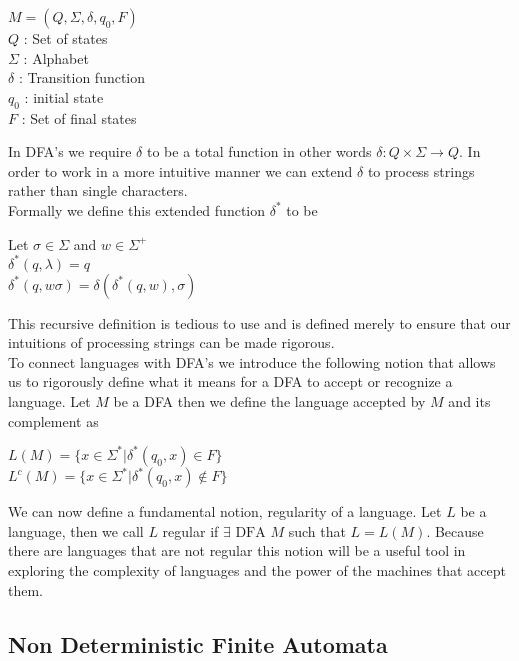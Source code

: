 \documentclass[11pt]{exam}
\begin{document}
\begin{center}
$M = (Q,\Sigma,\delta,q_0,F)$\\
$Q$ : Set of states\\
$\Sigma$ : Alphabet\\
$\delta$ : Transition function\\
$q_0$ : initial state\\
$F$ : Set of final states\\
\end{center}

In DFA's we require $\delta$ to be a total function in other words $\delta : Q \times \Sigma \rightarrow Q$. In order to work in a more intuitive manner we can extend $\delta$ to process strings rather than single characters.\\

Formally we define this extended function $\delta^*$ to be

\begin{center}
Let $\sigma \in \Sigma$ and $w \in \Sigma^+$\\
$\delta^*(q,\lambda) = q$\\
$\delta^*(q,w\sigma) = \delta(\delta^*(q,w),\sigma)$\\
\end{center}

This recursive definition is tedious to use and is defined merely to ensure that our intuitions of processing strings can be made rigorous.\\

To connect languages with DFA's we introduce the following notion that allows us to rigorously define what it means for a DFA to accept or recognize a language. Let $M$ be a DFA then we define the language accepted by $M$ and its complement as 

\begin{center}
$L(M) = \{ x \in \Sigma^* | \delta^*(q_0,x) \in F \}$\\
$L^c(M) = \{ x \in \Sigma^* | \delta^*(q_0,x) \notin F \}$\\
\end{center}

We can now define a fundamental notion, regularity of a language. Let $L$ be a language, then we call $L$ regular if $\exists \text{ DFA } M$ such that $L = L(M)$. Because there are languages that are not regular this notion will be a useful tool in exploring the complexity of languages and the power of the machines that accept them.

\subsection{Non Deterministic Finite Automata}
\end{document}
